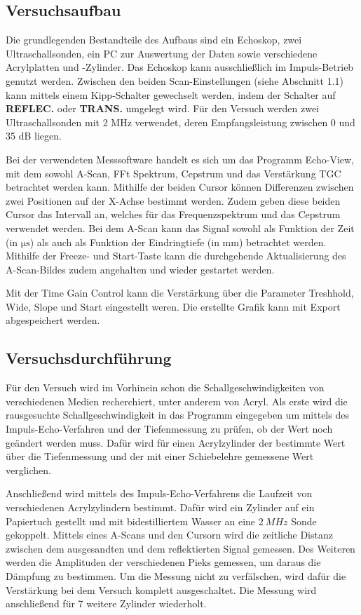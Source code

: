 \subsection{Versuchsaufbau}

Die grundlegenden Bestandteile des Aufbaus sind ein Echoskop, zwei Ultraschallsonden,
ein PC zur Auswertung der Daten sowie verschiedene Acrylplatten und -Zylinder.
Das Echoskop kann ausschließlich im Impuls-Betrieb genutzt werden. Zwischen den
beiden Scan-Einstellungen (siehe Abschnitt 1.1) kann mittels einem Kipp-Schalter
gewechselt werden, indem der Schalter auf \textbf{REFLEC.} oder \textbf{TRANS.}
umgelegt wird. Für den Versuch werden zwei Ultraschallsonden mit 2 MHz verwendet,
deren Empfangsleistung zwischen 0 und 35 dB liegen.

Bei der verwendeten Messsoftware handelt es sich um das Programm Echo-View, mit
dem sowohl A-Scan, FFt Spektrum, Cepstrum und das Verstärkung TGC betrachtet
werden kann. Mithilfe der beiden Cursor können Differenzen zwischen zwei Positionen
auf der X-Achse bestimmt werden. Zudem geben diese beiden Cursor das Intervall
an, welches für das Frequenzspektrum und das Cepstrum verwendet werden.
Bei dem A-Scan kann das Signal sowohl als Funktion der Zeit (in $\si{\micro\second}$)
als auch als Funktion der Eindringtiefe (in mm) betrachtet werden. Mithilfe der
Freeze- und Start-Taste kann die durchgehende Aktualisierung des A-Scan-Bildes
zudem angehalten und wieder gestartet werden.

Mit der Time Gain Control kann die Verstärkung über die Parameter Treshhold, Wide,
Slope und Start eingestellt weren. Die erstellte Grafik kann mit Export abgespeichert
werden.


\subsection{Versuchsdurchführung}

Für den Versuch wird im Vorhinein schon die Schallgeschwindigkeiten von verschiedenen
Medien recherchiert, unter anderem von Acryl. Als erste wird die rausgesuchte
Schallgeschwindigkeit in das Programm eingegeben um mittels des
Impuls-Echo-Verfahren und der Tiefenmessung zu prüfen, ob der Wert noch geändert
werden muss. Dafür wird für einen Acrylzylinder der bestimmte Wert über die
Tiefenmessung und der mit einer Schiebelehre gemessene Wert verglichen.

Anschließend wird mittels des Impuls-Echo-Verfahrens die Laufzeit von verschiedenen
Acrylzylindern bestimmt. Dafür wird ein Zylinder auf ein Papiertuch gestellt und
mit bidestilliertem Wasser an eine $\SI{2}{MHz}$ Sonde gekoppelt. Mittels eines
A-Scans und den Cursorn wird die zeitliche Distanz zwischen dem ausgesandten und
dem reflektierten Signal gemessen.
Des Weiteren werden die Amplituden der verschiedenen Pieks gemessen, um
daraus die Dämpfung zu bestimmen. Um die Messung nicht zu verfälschen, wird dafür
die Verstärkung bei dem Versuch komplett ausgeschaltet. Die Messung wird anschließend
für 7 weitere Zylinder wiederholt.

